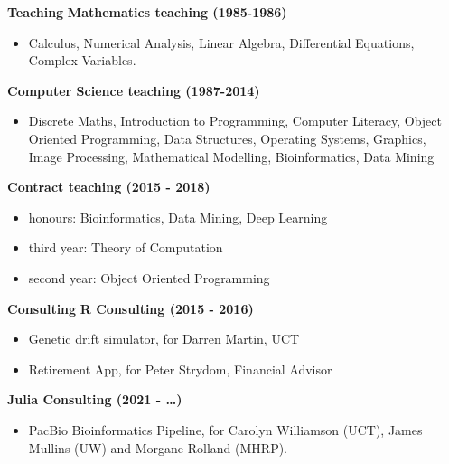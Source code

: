 \begin{description}
\begin{description}
\newpage
\item[] {\large \bf Teaching}\newline
\newline
{\large \bf Mathematics teaching (1985-1986)}

 \begin{itemize} 
  \item[] Calculus, Numerical Analysis, Linear Algebra, \newline
       Differential Equations, Complex Variables.
 \end{itemize}

{\large \bf  Computer Science teaching (1987-2014)}
\begin{itemize}
\item[]  Discrete Maths, Introduction to Programming, Computer Literacy, \newline
             Object Oriented Programming, Data Structures, \newline
             Operating Systems, Graphics, \newline
             Image Processing, Mathematical Modelling, \newline
             Bioinformatics, Data Mining
\end{itemize}


{\large \bf Contract teaching (2015 - 2018)}
\begin{itemize}
	\item[] honours: Bioinformatics, Data Mining, Deep Learning
	\item[] third year: Theory of Computation
	\item[] second year: Object Oriented Programming
\end{itemize}

\item[] {\large \bf Consulting}\newline
\newline
{\large \bf R Consulting (2015 - 2016)}

\begin{itemize}
\item[] Genetic drift simulator, for Darren Martin, UCT
\item[] Retirement App, for Peter Strydom, Financial Advisor
\end{itemize}

{\large \bf Julia Consulting (2021 - \ldots)}
\begin{itemize}
\item[] PacBio Bioinformatics Pipeline, for Carolyn Williamson (UCT),
James Mullins (UW) and Morgane Rolland (MHRP).
\end{itemize}




\end{description}
\end{description}
\label{f0}

